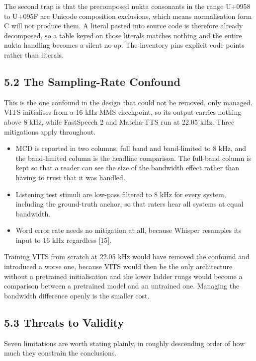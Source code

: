 \documentclass[12pt,a4paper]{article}
\begin{document}
The second trap is that the precomposed nukta consonants in the range U+0958 to U+095F are Unicode composition exclusions, which means normalisation form C will not produce them. A literal pasted into source code is therefore already decomposed, so a table keyed on those literals matches nothing and the entire nukta handling becomes a silent no-op. The inventory pins explicit code points rather than literals.

\subsection*{5.2  The Sampling-Rate Confound}
This is the one confound in the design that could not be removed, only managed. VITS initialises from a 16 kHz MMS checkpoint, so its output carries nothing above 8 kHz, while FastSpeech 2 and Matcha-TTS run at 22.05 kHz. Three mitigations apply throughout.

\begin{itemize}[leftmargin=1.6em,itemsep=2pt,topsep=3pt]
  \item MCD is reported in two columns, full band and band-limited to 8 kHz, and the band-limited column is the headline comparison. The full-band column is kept so that a reader can see the size of the bandwidth effect rather than having to trust that it was handled.
  \item Listening test stimuli are low-pass filtered to 8 kHz for every system, including the ground-truth anchor, so that raters hear all systems at equal bandwidth.
  \item Word error rate needs no mitigation at all, because Whisper resamples its input to 16 kHz regardless [15].
\end{itemize}

Training VITS from scratch at 22.05 kHz would have removed the confound and introduced a worse one, because VITS would then be the only architecture without a pretrained initialisation and the lower ladder rungs would become a comparison between a pretrained model and an untrained one. Managing the bandwidth difference openly is the smaller cost.

\subsection*{5.3  Threats to Validity}
Seven limitations are worth stating plainly, in roughly descending order of how much they constrain the conclusions.
\end{document}
